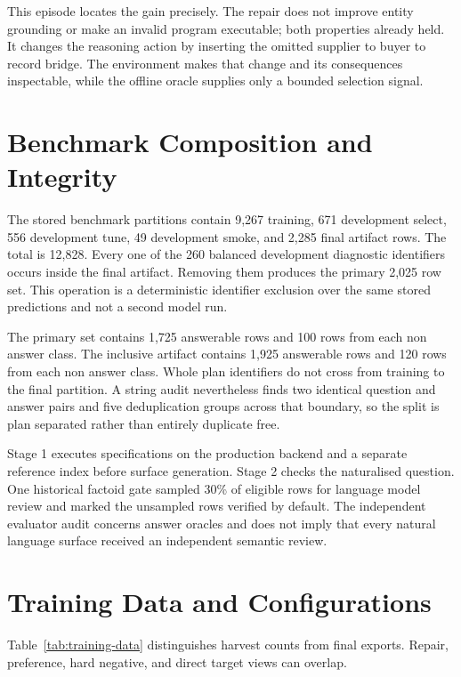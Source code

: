 \documentclass{article}
\begin{document}
This episode locates the gain precisely.  The repair does not improve entity grounding or make an
invalid program executable; both properties already held.  It changes the reasoning action by
inserting the omitted supplier to buyer to record bridge.  The environment makes that change and
its consequences inspectable, while the offline oracle supplies only a bounded selection signal.

\section{Benchmark Composition and Integrity}
\label{app:benchmark}

The stored benchmark partitions contain 9,267 training, 671 development select, 556 development
tune, 49 development smoke, and 2,285 final artifact rows.  The total is 12,828.  Every one of the
260 balanced development diagnostic identifiers occurs inside the final artifact.  Removing them
produces the primary 2,025 row set.  This operation is a deterministic identifier exclusion over
the same stored predictions and not a second model run.

The primary set contains 1,725 answerable rows and 100 rows from each non answer class.  The
inclusive artifact contains 1,925 answerable rows and 120 rows from each non answer class.  Whole
plan identifiers do not cross from training to the final partition.  A string audit nevertheless
finds two identical question and answer pairs and five deduplication groups across that boundary,
so the split is plan separated rather than entirely duplicate free.

Stage 1 executes specifications on the production backend and a separate reference index before
surface generation.  Stage 2 checks the naturalised question.  One historical factoid gate sampled
30\% of eligible rows for language model review and marked the unsampled rows verified by default.
The independent evaluator audit concerns answer oracles and does not imply that every natural
language surface received an independent semantic review.

\section{Training Data and Configurations}
\label{app:training}

Table~\ref{tab:training-data} distinguishes harvest counts from final exports.  Repair, preference,
hard negative, and direct target views can overlap.
\end{document}
